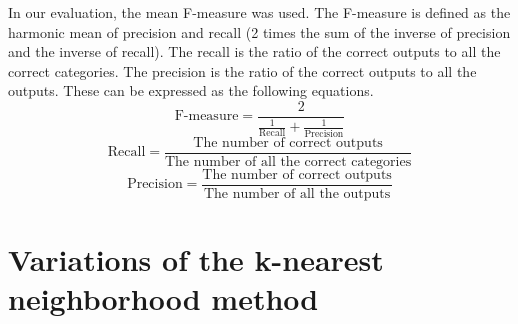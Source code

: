 \documentclass[english]{jnlp_1.2c}
\begin{document}
In our evaluation, the
mean F-measure was used. 
The F-measure is defined as the harmonic mean 
of precision and recall 
(2 times the sum of the inverse of precision 
and the inverse of recall).
The recall is the ratio of the correct outputs
to all the correct categories.
The precision is the ratio of the correct outputs
to all the outputs.
These can be expressed as the following equations.
\begin{equation}
\mbox{F-measure} = \frac{2}{\frac{1}{\mbox{Recall}} + \frac{1}{\mbox{Precision}}}
\end{equation}
\begin{equation}
\mbox{Recall} = \frac{\mbox{The number of correct outputs}}{\mbox{The number of all the correct categories}}
\end{equation}
\begin{equation}
\mbox{Precision} = \frac{\mbox{The number of correct outputs}}{\mbox{The number of all the outputs}}
\end{equation}


\section{Variations of the k-nearest neighborhood method}
\label{sec:variation}
\end{document}
